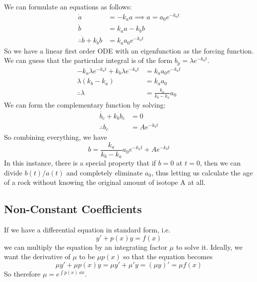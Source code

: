 \noindent We can formulate an equations as follows:
\begin{align*}
	\dot a                    & = -k_a a \implies a = a_0 e^{-k_a t} \\
	\dot b                    & = k_a a - k_b b                      \\
	\therefore \dot b + k_b b & = k_a a_0 e^{-k_a t}
\end{align*}
\noindent So we have a linear first order ODE with an eigenfunction as the forcing function. We can guess that the particular integral is of the form $b_p = \lambda e^{-k_a t}$.
\begin{align*}
	-k_a\lambda e^{-k_a t} + k_b \lambda e^{-k_a t} & = k_a a_0 e^{-k_a t}        \\
	\lambda(k_b-k_a)                                & = k_a a_0                   \\
	\therefore \lambda                              & = \frac{k_a}{k_b - k_a} a_0
\end{align*}
We can form the complementary function by solving:
\begin{align*}
	\dot{b_c} + k_b b_c & = 0           \\
	\therefore b_c      & = Ae^{-k_b t}
\end{align*}
So combining everything, we have
\[ b = \frac{k_a}{k_b - k_a} a_0 e^{-k_a t} + Ae^{-k_b t} \]
In this instance, there is a special property that if $b=0$ at $t=0$, then we can divide $b(t)/a(t)$ and completely eliminate $a_0$, thus letting us calculate the age of a rock without knowing the original amount of isotope A at all.

\subsection{Non-Constant Coefficients}
If we have a differential equation in standard form, i.e.
\[ y' + p(x)y = f(x) \]
we can multiply the equation by an integrating factor $\mu$ to solve it. Ideally, we want the derivative of $\mu$ to be $\mu p(x)$ so that the equation becomes
\[ \mu y' + \mu p(x) y = \mu y' + \mu' y = (\mu y)' = \mu f(x) \]
So therefore $\mu = e^{\int p(x)\ \dd{x}}$.
